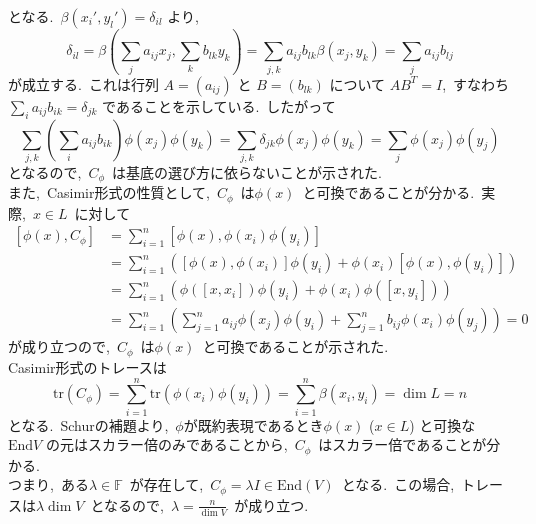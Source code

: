 \documentclass[uplatex,dvipdfmx]{jsarticle}
\begin{document}
となる.~$\beta(x_i', y_l') = \delta_{il}$ より,~
\begin{equation*}
    \delta_{il} = \beta\left( \sum_{j} a_{ij} x_j, \sum_{k} b_{lk} y_k \right) = \sum_{j,k} a_{ij} b_{lk} \beta(x_j, y_k) = \sum_{j} a_{ij} b_{lj}
\end{equation*}
が成立する.~これは行列 $A=(a_{ij})$ と $B=(b_{lk})$ について $AB^T = I$,~すなわち $\sum_{i} a_{ij} b_{ik} = \delta_{jk}$ であることを示している.~したがって
\begin{equation*}
    \sum_{j,k} \left( \sum_{i} a_{ij} b_{ik} \right) \phi(x_j) \phi(y_k) = \sum_{j,k} \delta_{jk} \phi(x_j) \phi(y_k) = \sum_{j} \phi(x_j) \phi(y_j)
\end{equation*}
となるので,~$C_\phi$~は基底の選び方に依らないことが示された.\\
また,~Casimir形式の性質として,~$C_\phi$~は$\phi(x)$~と可換であることが分かる.~実際,~$x\in L$~に対して
\begin{equation*}
    \begin{split}
        [\phi(x), C_\phi] &= \sum_{i=1}^n [\phi(x), \phi(x_i) \phi(y_i)]\\
        &= \sum_{i=1}^n \left( [\phi(x), \phi(x_i)] \phi(y_i) + \phi(x_i) [\phi(x), \phi(y_i)] \right)\\
        &= \sum_{i=1}^n \left( \phi([x, x_i]) \phi(y_i) + \phi(x_i) \phi([x, y_i]) \right)\\
        &= \sum_{i=1}^n \left( \sum_{j=1}^n a_{ij} \phi(x_j) \phi(y_i) + \sum_{j=1}^n b_{ij} \phi(x_i) \phi(y_j) \right) = 0
    \end{split}
\end{equation*}
が成り立つので,~$C_\phi$~は$\phi(x)$~と可換であることが示された.\\
Casimir形式のトレースは
\begin{equation*}
    \text{tr}(C_\phi) = \sum_{i=1}^n \text{tr}(\phi(x_i) \phi(y_i)) = \sum_{i=1}^n \beta(x_i, y_i) = \dim L = n
\end{equation*}
となる.~Schurの補題より,~$\phi$が既約表現であるとき$\phi(x)$ ($x \in L$) と可換な $\text{End} V$ の元はスカラー倍のみであることから,~$C_\phi$~はスカラー倍であることが分かる.\\
つまり,~ある$\lambda \in \mathbb{F}$~が存在して,~$C_\phi = \lambda I\in \text{End}(V)$~となる.~この場合,~トレースは$\lambda \dim V$~となるので,~$\lambda = \frac{n}{\dim V}$~が成り立つ.\\
\newpage
\end{document}
